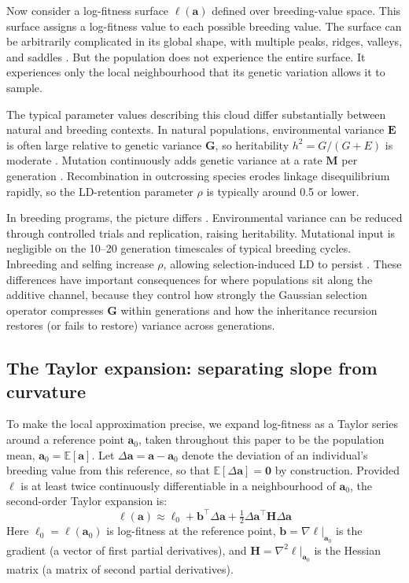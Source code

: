 \documentclass[9pt,twocolumn,twoside,lineno]{gsajnl}
\newcommand{\vect}[1]{\boldsymbol{#1}}
\newcommand{\mat}[1]{\mathbf{#1}}
\newcommand{\E}{\ensuremath{\mathbb{E}}\xspace}
\begin{document}
Now consider a log-fitness surface $\ell(\vect{a})$ defined over breeding-value space. This surface assigns a log-fitness value to each possible breeding value. The surface can be arbitrarily complicated in its global shape, with multiple peaks, ridges, valleys, and saddles \citep{Gavrilets2004}. But the population does not experience the entire surface. It experiences only the local neighbourhood that its genetic variation allows it to sample.

The typical parameter values describing this cloud differ substantially between natural and breeding contexts. In natural populations, environmental variance $\mat{E}$ is often large relative to genetic variance $\mat{G}$, so heritability $h^2 = G/(G + E)$ is moderate \citep{Visscher2008}. Mutation continuously adds genetic variance at a rate $\mat{M}$ per generation \citep{Lynch1998}. Recombination in outcrossing species erodes linkage disequilibrium rapidly, so the LD-retention parameter $\rho$ is typically around 0.5 or lower. 

In breeding programs, the picture differs \citep{Allard1999, FalconerMackay1996}. Environmental variance can be reduced through controlled trials and replication, raising heritability. Mutational input is negligible on the 10--20 generation timescales of typical breeding cycles. Inbreeding and selfing increase $\rho$, allowing selection-induced LD to persist \citep{Bulmer1971}. These differences have important consequences for where populations sit along the additive channel, because they control how strongly the Gaussian selection operator compresses $\mat{G}$ within generations and how the inheritance recursion restores (or fails to restore) variance across generations.

\subsection{The Taylor expansion: separating slope from curvature}

To make the local approximation precise, we expand log-fitness as a Taylor series around a reference point $\vect{a}_0$, taken throughout this paper to be the population mean, $\vect{a}_0 = \E[\vect{a}]$. Let $\Delta\vect{a} = \vect{a} - \vect{a}_0$ denote the deviation of an individual's breeding value from this reference, so that $\E[\Delta\vect{a}] = \vect{0}$ by construction. Provided $\ell$ is at least twice continuously differentiable in a neighbourhood of $\vect{a}_0$, the second-order Taylor expansion is:
\begin{equation}
\ell(\vect{a}) \approx \ell_0 + \vect{b}^\top \Delta\vect{a} + \tfrac{1}{2} \Delta\vect{a}^\top \mat{H} \Delta\vect{a}
\label{eq:taylor}
\end{equation}
Here $\ell_0 = \ell(\vect{a}_0)$ is log-fitness at the reference point, $\vect{b} = \nabla\ell|_{\vect{a}_0}$ is the gradient (a vector of first partial derivatives), and $\mat{H} = \nabla^2\ell|_{\vect{a}_0}$ is the Hessian matrix (a matrix of second partial derivatives).
\end{document}
